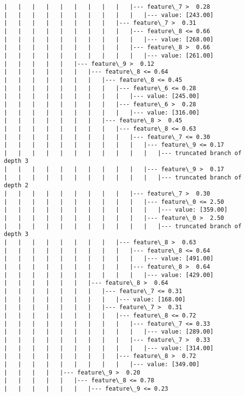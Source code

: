 \documentclass[11pt]{article}
\begin{document}
\begin{Verbatim}[commandchars=\\\{\}]
|   |   |   |   |   |   |   |   |   |--- feature\_7 >  0.28
|   |   |   |   |   |   |   |   |   |   |--- value: [243.00]
|   |   |   |   |   |   |   |   |--- feature\_7 >  0.31
|   |   |   |   |   |   |   |   |   |--- feature\_8 <= 0.66
|   |   |   |   |   |   |   |   |   |   |--- value: [268.00]
|   |   |   |   |   |   |   |   |   |--- feature\_8 >  0.66
|   |   |   |   |   |   |   |   |   |   |--- value: [261.00]
|   |   |   |   |   |--- feature\_9 >  0.12
|   |   |   |   |   |   |--- feature\_8 <= 0.64
|   |   |   |   |   |   |   |--- feature\_8 <= 0.45
|   |   |   |   |   |   |   |   |--- feature\_6 <= 0.28
|   |   |   |   |   |   |   |   |   |--- value: [245.00]
|   |   |   |   |   |   |   |   |--- feature\_6 >  0.28
|   |   |   |   |   |   |   |   |   |--- value: [316.00]
|   |   |   |   |   |   |   |--- feature\_8 >  0.45
|   |   |   |   |   |   |   |   |--- feature\_8 <= 0.63
|   |   |   |   |   |   |   |   |   |--- feature\_7 <= 0.30
|   |   |   |   |   |   |   |   |   |   |--- feature\_9 <= 0.17
|   |   |   |   |   |   |   |   |   |   |   |--- truncated branch of depth 3
|   |   |   |   |   |   |   |   |   |   |--- feature\_9 >  0.17
|   |   |   |   |   |   |   |   |   |   |   |--- truncated branch of depth 2
|   |   |   |   |   |   |   |   |   |--- feature\_7 >  0.30
|   |   |   |   |   |   |   |   |   |   |--- feature\_0 <= 2.50
|   |   |   |   |   |   |   |   |   |   |   |--- value: [359.00]
|   |   |   |   |   |   |   |   |   |   |--- feature\_0 >  2.50
|   |   |   |   |   |   |   |   |   |   |   |--- truncated branch of depth 3
|   |   |   |   |   |   |   |   |--- feature\_8 >  0.63
|   |   |   |   |   |   |   |   |   |--- feature\_8 <= 0.64
|   |   |   |   |   |   |   |   |   |   |--- value: [491.00]
|   |   |   |   |   |   |   |   |   |--- feature\_8 >  0.64
|   |   |   |   |   |   |   |   |   |   |--- value: [429.00]
|   |   |   |   |   |   |--- feature\_8 >  0.64
|   |   |   |   |   |   |   |--- feature\_7 <= 0.31
|   |   |   |   |   |   |   |   |--- value: [168.00]
|   |   |   |   |   |   |   |--- feature\_7 >  0.31
|   |   |   |   |   |   |   |   |--- feature\_8 <= 0.72
|   |   |   |   |   |   |   |   |   |--- feature\_7 <= 0.33
|   |   |   |   |   |   |   |   |   |   |--- value: [289.00]
|   |   |   |   |   |   |   |   |   |--- feature\_7 >  0.33
|   |   |   |   |   |   |   |   |   |   |--- value: [314.00]
|   |   |   |   |   |   |   |   |--- feature\_8 >  0.72
|   |   |   |   |   |   |   |   |   |--- value: [349.00]
|   |   |   |   |--- feature\_9 >  0.20
|   |   |   |   |   |--- feature\_8 <= 0.78
|   |   |   |   |   |   |--- feature\_9 <= 0.23

\end{Verbatim}
\end{document}
